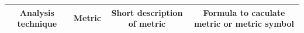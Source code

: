 \begin{table}
\begin{adjustbox}{scale=0.65,center}
\begin{tabular}{ccll}
\hline
\textbf{Analysis technique}                                                      & \textbf{Metric}                                                                                    & \multicolumn{1}{c}{\textbf{Short description of metric}}                                                                                                                                                                                                                                                                                                                                                                                                                                                                                                                                                                                                       & \multicolumn{1}{c}{\textbf{Formula to caculate metric or metric symbol}}                                                                                                                                                                                                                                                                                                                                                                                                                                                                                               \\ \hline

\end{tabular}
\end{adjustbox}
\end{table}
